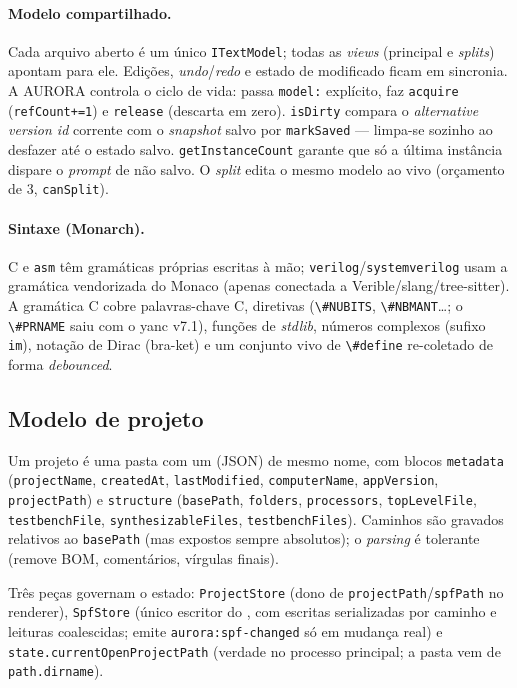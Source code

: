\documentclass[11pt,a4paper,oneside]{article}
\newcommand{\cmm}{C\textpm{}}
\newcommand{\tool}[1]{\textsc{#1}}
\newcommand{\code}[1]{\lstinline[basicstyle=\ttfamily]|#1|}
\begin{document}
\paragraph{Modelo compartilhado.} Cada arquivo aberto é um único
\code{ITextModel}; todas as \emph{views} (principal e \emph{splits}) apontam
para ele. Edições, \emph{undo}/\emph{redo} e estado de modificado ficam em
sincronia. A \tool{AURORA} controla o ciclo de vida: passa \lstinline|model:|
explícito, faz \code{acquire} (\lstinline|refCount+=1|) e \code{release}
(descarta em zero). \code{isDirty} compara o \emph{alternative version id}
corrente com o \emph{snapshot} salvo por \code{markSaved} — limpa-se sozinho ao
desfazer até o estado salvo. \code{getInstanceCount} garante que só a última
instância dispare o \emph{prompt} de não salvo. O \emph{split} edita o mesmo
modelo ao vivo (orçamento de 3, \code{canSplit}).

\paragraph{Sintaxe (Monarch).} \cmm{} e \code{asm} têm gramáticas próprias
escritas à mão; \code{verilog}/\code{systemverilog} usam a gramática
vendorizada do Monaco (apenas conectada a Verible/slang/tree-sitter). A
gramática \cmm{} cobre palavras-chave C, diretivas (\code{\#NUBITS},
\code{\#NBMANT}…; o \code{\#PRNAME} saiu com o yanc v7.1), funções de \emph{stdlib}, números complexos (sufixo
\code{im}), notação de Dirac (bra-ket) e um conjunto vivo de \code{\#define}
re-coletado de forma \emph{debounced}.

\subsection{Modelo de projeto}
Um projeto é uma pasta com um  (JSON) de mesmo nome, com blocos
\lstinline|metadata| (\code{projectName}, \code{createdAt}, \code{lastModified},
\code{computerName}, \code{appVersion}, \code{projectPath}) e
\lstinline|structure| (\code{basePath}, \code{folders}, \code{processors},
\code{topLevelFile}, \code{testbenchFile}, \code{synthesizableFiles},
\code{testbenchFiles}). Caminhos são gravados relativos ao \code{basePath} (mas
expostos sempre absolutos); o \emph{parsing} é tolerante (remove BOM,
comentários, vírgulas finais).

Três peças governam o estado: \code{ProjectStore} (dono de
\code{projectPath}/\code{spfPath} no renderer), \code{SpfStore} (único escritor
do , com escritas serializadas por caminho e leituras coalescidas;
emite \lstinline|aurora:spf-changed| só em mudança real) e
\code{state.currentOpenProjectPath} (verdade no processo principal; a pasta vem
de \lstinline|path.dirname|).
\end{document}
